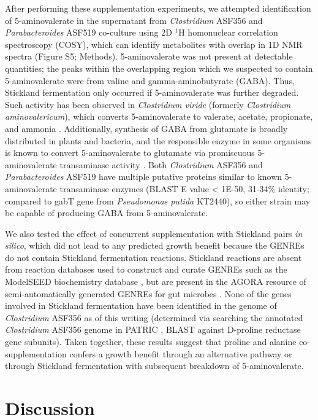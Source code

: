 \documentclass[11pt,twocolumn,notitlepage,openany,twoside]{book}
\begin{document}
\begin{refsection}
After performing these supplementation experiments, we attempted identification of 5-aminovalerate in the supernatant from \textit{Clostridium} ASF356 and \textit{Parabacteroides} ASF519 co-culture using 2D $^1\!$H homonuclear correlation spectroscopy (COSY), which can identify metabolites with overlap in 1D NMR spectra (Figure S5; Methods). 5-aminovalerate was not present at detectable quantities; the peaks within the overlapping region which we suspected to contain 5-aminovalerate were from valine and gamma-aminobutyrate (GABA). Thus, Stickland fermentation only occurred if 5-aminovalerate was further degraded. Such activity has been observed in \textit{Clostridium viride} (formerly \textit{Clostridium aminovalericum}), which converts 5-aminovalerate to valerate, acetate, propionate, and ammonia \cite{Barker1985-rs,Barker1987-jt}. Additionally, synthesis of GABA from glutamate is broadly distributed in plants and bacteria, and the responsible enzyme in some organisms is known to convert 5-aminovalerate to glutamate via promiscuous 5-aminovalerate transaminase activity \cite{Shin2016-vy,Yonaha1985-xp}. Both \textit{Clostridium} ASF356 and \textit{Parabacteroides} ASF519 have multiple putative proteins similar to known 5-aminovalerate transaminase enzymes (BLAST E value < 1E-50, 31-34\% identity; compared to gabT gene from \textit{Pseudomonas putida} KT2440), so either strain may be capable of producing GABA from 5-aminovalerate.

We also tested the effect of concurrent supplementation with Stickland pairs \textit{in silico}, which did not lead to any predicted growth benefit because the GENREs do not contain Stickland fermentation reactions. Stickland reactions are absent from reaction databases used to construct and curate GENREs such as the ModelSEED biochemistry database \cite{Henry2010-um}, but are present in the AGORA resource of semi-automatically generated GENREs for gut microbes \cite{Magnusdottir2017-dk}. None of the genes involved in Stickland fermentation have been identified in the genome of \textit{Clostridium} ASF356 as of this writing (determined via searching the annotated \textit{Clostridium} ASF356 genome in PATRIC \cite{Wattam2017-tk}, BLAST against D-proline reductase gene subunits). Taken together, these results suggest that proline and alanine co-supplementation confers a growth benefit through an alternative pathway or through Stickland fermentation with subsequent breakdown of 5-aminovalerate.


\section{Discussion}


\end{refsection}
\end{document}
